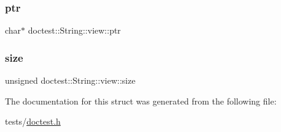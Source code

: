 \subsubsection{\texorpdfstring{ptr}{ptr}}
{\footnotesize\ttfamily char$\ast$ doctest\+::\+String\+::view\+::ptr}

\mbox{\label{structdoctest_1_1String_1_1view_a41d7343e928b0e23c973521aac5b59d3}} 
\subsubsection{\texorpdfstring{size}{size}}
{\footnotesize\ttfamily unsigned doctest\+::\+String\+::view\+::size}



The documentation for this struct was generated from the following file\+:\begin{DoxyCompactItemize}
\item 
tests/\hyperlink{doctest_8h}{doctest.\+h}\end{DoxyCompactItemize}
